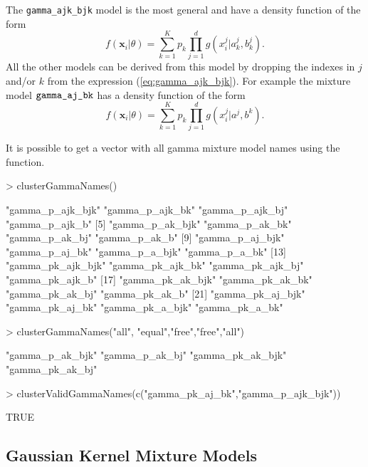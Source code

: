 \documentclass[shortnames,nojss,article]{jss}
\newcommand{\bx}{\mathbf{x}}
\begin{document}
The \verb+gamma_ajk_bjk+ model is the most general and have a density function of the form
\begin{equation}\label{eq:gamma_ajk_bjk}
  f({\bx}_i|\theta) = \sum_{k=1}^K p_k \prod_{j=1}^d g(x^j_{i}| a^j_{k},b^j_{k}).
\end{equation}
All the other models can be derived from this model by dropping the indexes in
$j$ and/or $k$ from the expression (\ref{eq:gamma_ajk_bjk}). For example the
mixture model $\verb+gamma_aj_bk+$ has a density function of the form
\begin{equation}\label{eq:gamma_aj_bk}
  f({\bx}_i|\theta) = \sum_{k=1}^K p_k \prod_{j=1}^d g(x^j_{i}| a^j,b^{k}).
\end{equation}

It is possible to get a vector with all gamma mixture model names using
the  function.
\begin{Schunk}
\begin{Sinput}
> clusterGammaNames()
\end{Sinput}
\begin{Soutput}
 [1] "gamma_p_ajk_bjk"  "gamma_p_ajk_bk"   "gamma_p_ajk_bj"   "gamma_p_ajk_b"   
 [5] "gamma_p_ak_bjk"   "gamma_p_ak_bk"    "gamma_p_ak_bj"    "gamma_p_ak_b"    
 [9] "gamma_p_aj_bjk"   "gamma_p_aj_bk"    "gamma_p_a_bjk"    "gamma_p_a_bk"    
[13] "gamma_pk_ajk_bjk" "gamma_pk_ajk_bk"  "gamma_pk_ajk_bj"  "gamma_pk_ajk_b"  
[17] "gamma_pk_ak_bjk"  "gamma_pk_ak_bk"   "gamma_pk_ak_bj"   "gamma_pk_ak_b"   
[21] "gamma_pk_aj_bjk"  "gamma_pk_aj_bk"   "gamma_pk_a_bjk"   "gamma_pk_a_bk"   
\end{Soutput}
\begin{Sinput}
> clusterGammaNames("all", "equal","free","free","all")
\end{Sinput}
\begin{Soutput}
[1] "gamma_p_ak_bjk"  "gamma_p_ak_bj"   "gamma_pk_ak_bjk" "gamma_pk_ak_bj" 
\end{Soutput}
\begin{Sinput}
> clusterValidGammaNames(c("gamma_pk_aj_bk","gamma_p_ajk_bjk"))
\end{Sinput}
\begin{Soutput}
[1] TRUE
\end{Soutput}
\end{Schunk}

\subsection{Gaussian Kernel Mixture Models}
\label{subsec:Kernel}
\end{document}
